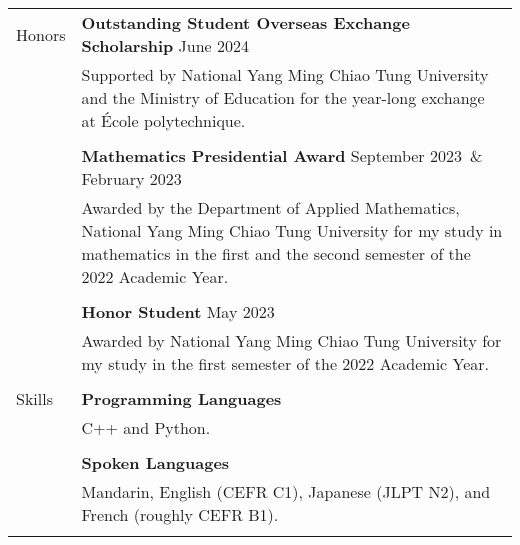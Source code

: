 \documentclass[letterpaper, 11pt]{article}
\newcommand{\spaceand}{\,\&\ \,}
\begin{document}
\begin{center}
\begin{longtable}{p{0.76in}p{5.93in}}
        {\textcolor{OliveGreen}{Honors}} & \textbf{Outstanding Student Overseas Exchange Scholarship} \hfill June 2024\\
        & Supported by National Yang Ming Chiao Tung University and the Ministry of Education for the year-long exchange at \'Ecole polytechnique. \\
        & \\
        & \textbf{Mathematics Presidential Award} \hfill September 2023 \spaceand February 2023\\
        & Awarded by the Department of Applied Mathematics, National Yang Ming Chiao Tung University for my study in mathematics in the first and the second semester of the 2022 Academic Year.\\
        & \\
        & \textbf{Honor Student} \hfill May 2023\\
        & Awarded by National Yang Ming Chiao Tung University for my study in the first semester of the 2022 Academic Year. \\
        & \\

        
        {\textcolor{OliveGreen}{Skills}} 
        & \textbf{Programming Languages}\\
        & C++ and Python.\\
        & \\

        & \textbf{Spoken Languages} \\
        & Mandarin, English (CEFR C1), Japanese (JLPT N2), and French (roughly CEFR B1).\\
        & \\


\end{longtable}
\end{center}
\end{document}
